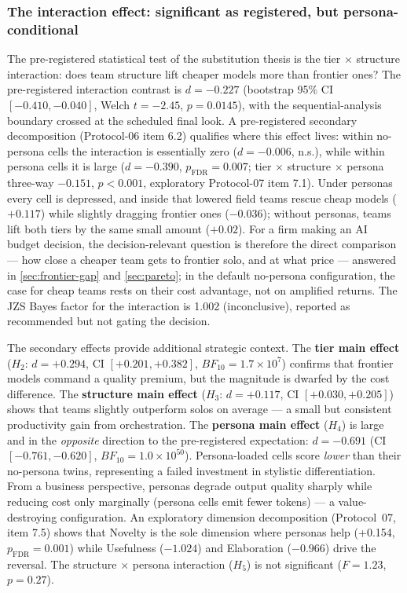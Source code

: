 \documentclass[12pt,a4paper]{article}
\newcommand{\BF}{\ensuremath{\mathit{BF}}}
\begin{document}
\subsubsection{The interaction effect: significant as registered, but
persona-conditional}\label{sec:interaction}

The pre-registered statistical test of the substitution thesis is the tier
$\times$ structure interaction: does team structure lift cheaper models more
than frontier ones? The pre-registered interaction contrast is $d = -0.227$
(bootstrap 95\% CI $[-0.410, -0.040]$, Welch $t = -2.45$, $p = 0.0145$), with
the sequential-analysis boundary crossed at the scheduled final look. A
pre-registered secondary decomposition (Protocol-06 item 6.2) qualifies where
this effect lives: within no-persona cells the interaction is essentially zero
($d = -0.006$, n.s.), while within persona cells it is large
($d = -0.390$, $p_{\mathrm{FDR}} = 0.007$; tier $\times$ structure $\times$
persona three-way $-0.151$, $p < 0.001$, exploratory Protocol-07 item 7.1).
Under personas every cell is depressed, and inside that lowered field teams
rescue cheap models ($+0.117$) while slightly dragging frontier ones
($-0.036$); without personas, teams lift both tiers by the same small amount
($+0.02$). For a
firm making an AI budget decision, the decision-relevant question is therefore
the direct comparison --- how close a cheaper team gets to frontier solo, and
at what price --- answered in \cref{sec:frontier-gap} and \cref{sec:pareto};
in the default no-persona configuration, the case for
cheap teams rests on their cost advantage, not on
amplified returns. The JZS Bayes factor for the interaction is
1.002 (inconclusive), reported as recommended but not gating the decision.

The secondary effects provide additional strategic context. The \textbf{tier
main effect} ($H_2$: $d = +0.294$, CI $[+0.201, +0.382]$, $\BF_{10} = 1.7 \times
10^7$) confirms that frontier models command a quality premium, but the
magnitude is dwarfed by the cost difference. The \textbf{structure main effect}
($H_3$: $d = +0.117$, CI $[+0.030, +0.205]$) shows that teams slightly outperform
solos on average --- a small but consistent productivity gain from
orchestration. The \textbf{persona main effect} ($H_4$) is large and in the
\emph{opposite} direction to the pre-registered expectation: $d = -0.691$ (CI
$[-0.761, -0.620]$, $\BF_{10} = 1.0 \times 10^{50}$). Persona-loaded cells
score \emph{lower} than their no-persona twins, representing a failed
investment in stylistic differentiation. From a business perspective, personas
degrade output quality sharply while reducing cost only marginally (persona
cells emit fewer tokens) --- a value-destroying configuration. An exploratory dimension decomposition (Protocol~07, item
7.5) shows that Novelty is the sole
dimension where personas help (+0.154, $p_{\mathrm{FDR}} = 0.001$) while
Usefulness ($-1.024$) and Elaboration ($-0.966$) drive the reversal. The
structure $\times$ persona interaction ($H_5$) is not significant ($F = 1.23$, $p =
0.27$).
\end{document}
